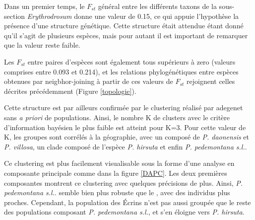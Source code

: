Dans un premier temps, le $F_{st}$ général entre les différents taxons de la sous-section \textit{Erythrodrosum} donne une valeur de 0.15, ce qui appuie l'hypothèse la présence d'une structure génétique. Cette structure était attendue étant donné qu'il s'agit de plusieurs espèces, mais pour autant il est important de remarquer que la valeur reste faible.

Les $F_{st}$ entre paires d'espèces sont également tous supérieurs à zero (valeurs comprises entre 0.093 et 0.214), et les relations phylogénétiques entre espèces obtenues par neigbhor-joining à partir de ces valeurs de $F_{st}$ rejoignent celles décrites précédemment (Figure \ref{topologie}).

Cette structure est par ailleurs confirmée par le clustering réalisé par adegenet sans \textit{a priori} de populations. Ainsi, le nombre K de clusters avec le critère d'information bayésien le plus faible \DIFdelbegin {}\DIFdelend est atteint pour K=3.
Pour cette valeur de K, les groupes sont corrélés à la géographie, avec un  composé de \textit{P. daonensis} et \textit{P. villosa}, un clade composé de l'espèce \textit{P. hirsuta} et enfin \textit{P. pedemontana s.l.}.

Ce clustering est plus facilement visualisable sous la forme d'une analyse en composante principale comme dans la figure \ref{DAPC}. Les deux premières composantes montrent ce clustering avec quelques précisions de plus. Ainsi, \textit{P. pedemontana s.l.}. semble bien plus robuste que le , avec des individus plus proches. Cependant, la population des Écrins n'est pas aussi groupée que le reste des populations composant \textit{P. pedemontana s.l.}, et s'en éloigne vers \textit{P. hirsuta}.

